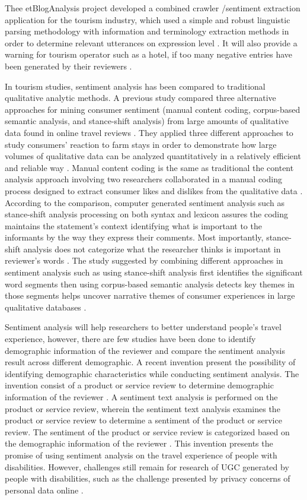 Thee etBlogAnalysis project developed a combined crawler /sentiment 
extraction application for the tourism industry, which used a simple 
and robust linguistic parsing methodology with information and 
terminology extraction methods in order to determine relevant utterances 
on expression level \cite{opinion2014}. It will also provide a warning 
for tourism operator such as a hotel, if too many negative entries have 
been generated by their reviewers \cite{Garcia2012}.

In tourism studies, sentiment analysis has been compared to traditional 
qualitative analytic methods. A previous study compared three alternative 
approaches for mining consumer sentiment (manual content coding, corpus-based 
semantic analysis, and stance-shift analysis) from large amounts of qualitative 
data found in online travel reviews \cite{Farm}. They applied three different
approaches to study consumers' reaction to farm stays in order to demonstrate 
how large volumes of qualitative data can be analyzed quantitatively in a 
relatively efficient and reliable way \cite{Farm}.  Manual content coding is 
the same as traditional the content analysis approach involving two researchers 
collaborated in a manual coding process designed to extract consumer likes 
and dislikes from the qualitative data \cite{Farm}. According to the comparison, 
computer generated sentiment analysis such as stance-shift analysis processing 
on both syntax and lexicon assures the coding maintains the statement's context 
identifying what is important to the informants by the way they express their 
comments. Most importantly, stance-shift analysis does not categorize what the 
researcher thinks is important in reviewer's words \cite{Farm}. The study suggested 
by combining different approaches in sentiment analysis such as using stance-shift 
analysis first identifies the significant word segments then using corpus-based 
semantic analysis detects key themes in those segments helps uncover narrative 
themes of consumer experiences in large qualitative databases \cite{Farm}.

Sentiment analysis will help researchers to better understand people's travel 
experience, however, there are few studies have been done to identify 
demographic information of the reviewer and compare the sentiment analysis 
result across different demographic. A recent invention present the possibility 
of identifying demographic characteristics while conducting sentiment analysis. 
The invention consist of a product or service review to determine demographic 
information of the reviewer \cite{Bhatt2014}. A sentiment text analysis is 
performed on the product or service review, wherein the sentiment text analysis 
examines the product or service review to determine a sentiment of the product or 
service review. The sentiment of the product or service review is categorized 
based on the demographic information of the reviewer \cite{Bhatt2014}. This 
invention presents the promise of using sentiment analysis on the travel 
experience of people with disabilities. However, challenges still remain 
for research of UGC generated by people with disabilities, such as the 
challenge presented by privacy concerns of personal data online \cite{lazar}. 


